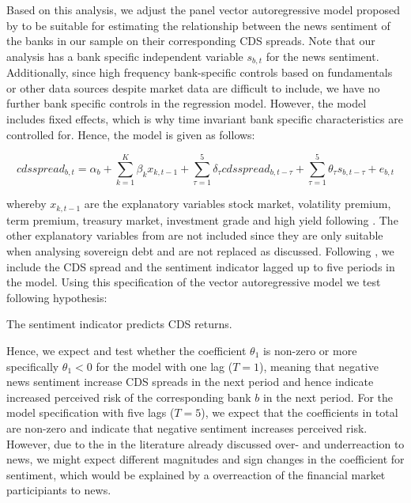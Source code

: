 Based on this analysis, we adjust the panel vector autoregressive model proposed by \cite{cathcart2020} to be suitable for estimating the relationship between the news sentiment of the banks in our sample on their corresponding CDS spreads. Note that our analysis has a bank specific independent variable $s_{b,t}$ for the news sentiment. Additionally, since high frequency bank-specific controls based on fundamentals or other data sources despite market data are difficult to include, we have no further bank specific controls in the regression model. However, the model includes fixed effects, which is why time invariant bank specific characteristics are controlled for. Hence, the model is given as follows:

\begin{equation} \label{eq:panelvar-cds-exogsenti}
	cdsspread_{b,t} = \alpha_b + \sum_{k=1}^K\beta_{k}x_{k,t-1} + \sum^5_{\tau=1} \delta_{\tau}cdsspread_{b,t-\tau} + \sum^5_{\tau=1}\theta_{\tau}s_{b,t-\tau} + e_{b,t}
\end{equation}

whereby $x_{k,t-1}$ are the explanatory variables stock market, volatility premium, term premium, treasury market, investment grade and high yield following \cite{cathcart2020}. The other explanatory variables from \cite{cathcart2020} are not included since they are only suitable when analysing sovereign debt and are not replaced as discussed. Following \cite{cathcart2020}, we include the CDS spread and the sentiment indicator lagged up to five periods in the model. Using this specification of the vector autoregressive model we test following hypothesis:

\begin{hyp}
	The sentiment indicator predicts CDS returns.
\end{hyp}

Hence, we expect and test whether the coefficient $\theta_1$ is non-zero or more specifically $\theta_1<0$ for the model with one lag ($T=1$), meaning that negative news sentiment increase CDS spreads in the next period and hence indicate increased perceived risk of the corresponding bank $b$ in the next period. For the model specification with five lags ($T=5$), we expect that the coefficients in total are non-zero and indicate that negative sentiment increases perceived risk. However, due to the in the literature already discussed over- and underreaction to news, we might expect different magnitudes and sign changes in the coefficient for sentiment, which would be explained by a overreaction of the financial market participiants to news. \\

